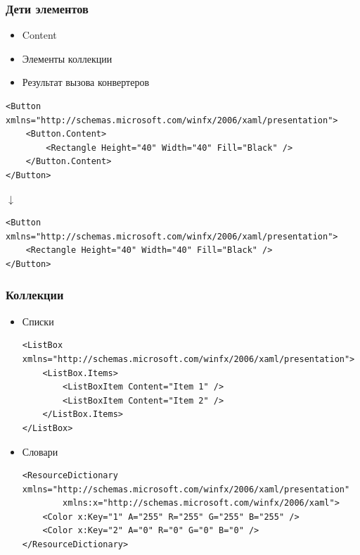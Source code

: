\documentclass[xetex,mathserif,serif]{beamer}
\newcommand{\DownArrow} {
    \hspace{2cm}\begin{LARGE}$\downarrow$\end{LARGE}
}
\begin{document}
    \begin{frame}[fragile]
        \frametitle{Дети элементов}
        \begin{itemize}
            \item Content
            \item Элементы коллекции
            \item Результат вызова конвертеров
        \end{itemize}
        \vspace{3mm}
        \begin{scriptsize}
            \begin{verbatim}
<Button xmlns="http://schemas.microsoft.com/winfx/2006/xaml/presentation">
    <Button.Content>
        <Rectangle Height="40" Width="40" Fill="Black" />
    </Button.Content>
</Button>
            \end{verbatim}

            \DownArrow
            \begin{verbatim}
<Button xmlns="http://schemas.microsoft.com/winfx/2006/xaml/presentation">
    <Rectangle Height="40" Width="40" Fill="Black" />
</Button>
            \end{verbatim}
        \end{scriptsize}
    \end{frame}

    \begin{frame}[fragile]
        \frametitle{Коллекции}
        \begin{scriptsize}
            \begin{itemize}
                \item Списки
                    \begin{verbatim}
<ListBox xmlns="http://schemas.microsoft.com/winfx/2006/xaml/presentation">
    <ListBox.Items>
        <ListBoxItem Content="Item 1" />
        <ListBoxItem Content="Item 2" />
    </ListBox.Items>
</ListBox>
                    \end{verbatim}
                \item Словари
                    \begin{verbatim}
<ResourceDictionary xmlns="http://schemas.microsoft.com/winfx/2006/xaml/presentation"
        xmlns:x="http://schemas.microsoft.com/winfx/2006/xaml">
    <Color x:Key="1" A="255" R="255" G="255" B="255" />
    <Color x:Key="2" A="0" R="0" G="0" B="0" />
</ResourceDictionary>
                    \end{verbatim}
            \end{itemize}
        \end{scriptsize}
    \end{frame}
\end{document}
